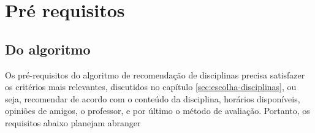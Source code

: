 
\chapter{Pré requisitos}
\label{cha:Pr\'e-requisitos}

\section{Do algoritmo}

Os pré-requisitos do algoritmo de recomendação de disciplinas precisa satisfazer os critérios mais relevantes, discutidos no capítulo \ref{sec:escolha-disciplinas}, ou seja, recomendar de acordo com o conteúdo da disciplina, horários disponíveis, opiniões de amigos, o professor, e por último o método de avaliação.
Portanto, os requisitos abaixo planejam abranger 